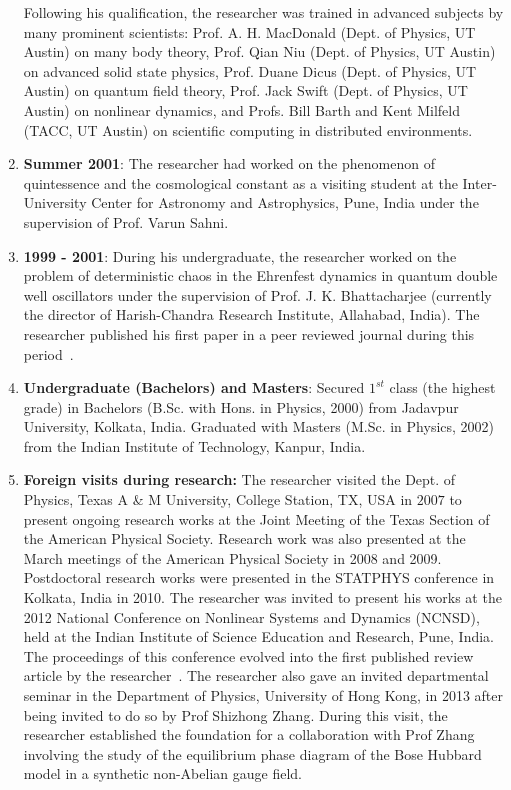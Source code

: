 \documentclass[a4paper,11pt,color]{article}
\begin{document}
\begin{enumerate}
Following his qualification, the researcher was trained in advanced subjects by many prominent scientists: Prof. A. H. MacDonald (Dept. of Physics, UT Austin) on many body theory, Prof. Qian Niu (Dept. of Physics, UT Austin) on advanced solid state physics, Prof. Duane Dicus (Dept. of Physics, UT Austin) on quantum field theory, Prof. Jack Swift (Dept. of Physics, UT Austin) on nonlinear dynamics, and Profs. Bill Barth and Kent Milfeld (TACC, UT Austin) on scientific computing in distributed environments.
\item
\textbf{Summer 2001}: The researcher had worked on the phenomenon of quintessence and the cosmological constant as a visiting student at the Inter-University Center for Astronomy and Astrophysics, Pune, India under the supervision of Prof. Varun Sahni.
\item
\textbf{1999 - 2001}: During his undergraduate, the researcher worked on the problem of deterministic chaos in the Ehrenfest dynamics in quantum double well oscillators under the supervision of Prof. J. K. Bhattacharjee (currently the director of Harish-Chandra Research Institute, Allahabad, India). The researcher published his first paper in a peer reviewed journal during this period~\cite{myfirstpaper}.
\item
\textbf{Undergraduate (Bachelors) and Masters}: Secured $1^{st}$ class (the highest grade) in Bachelors (B.Sc. with Hons. in Physics, 2000) from Jadavpur University, Kolkata, India. Graduated with Masters (M.Sc. in Physics, 2002) from the Indian Institute of Technology, Kanpur, India.
\item
\textbf{Foreign visits during research:}
The researcher visited the Dept. of Physics, Texas A \& M University, College Station, TX, USA in $2007$ to present ongoing research works at the Joint Meeting of the Texas Section of the  American Physical Society. Research work was also presented at the March meetings of the American Physical Society in 2008 and 2009. Postdoctoral research works were presented in the STATPHYS conference in Kolkata, India in 2010. The researcher was invited to present his works at the 2012 National Conference on Nonlinear Systems and Dynamics (NCNSD), held at the Indian Institute of Science Education and Research, Pune, India. The proceedings of this conference evolved into the first published review article by the researcher~\cite{ncnsd2012}.
The researcher also gave an invited departmental seminar in the Department of Physics, University of Hong Kong, in 2013 after being invited to do so by Prof Shizhong Zhang. During this visit, the researcher established the foundation for a collaboration with Prof Zhang involving the study of the equilibrium phase diagram of the Bose Hubbard model in a synthetic non-Abelian gauge field. 

\end{enumerate}
\end{document}
